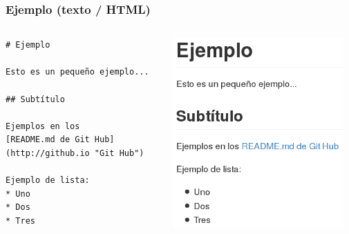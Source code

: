 \begin{frame}[fragile]
\frametitle{Ejemplo (texto / HTML)}

\begin{columns}[T]
\begin{column}{.43\textwidth}

\begin{verbatim}
# Ejemplo

Esto es un pequeño ejemplo...

## Subtítulo

Ejemplos en los
[README.md de Git Hub]
(http://github.io "Git Hub")

Ejemplo de lista:
* Uno
* Dos
* Tres
\end{verbatim}

\end{column}%
\hfill%
\begin{column}{.53\textwidth}
\includegraphics[width=6.5cm]{figs/markdown-ejemplo}
\end{column}%
\end{columns}

\end{frame}

